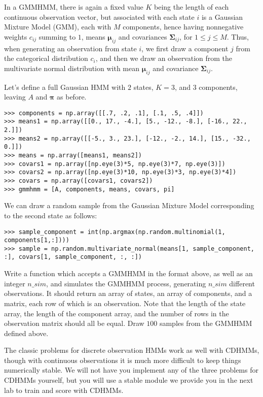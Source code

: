 In a GMMHMM, there is again a fixed value $K$ being the length of each continuous observation vector, but associated with each state $i$ is a Gaussian Mixture Model (GMM), each with $M$ components, hence having nonnegative weights $c_{ij}$ summing to $1$, means $\mathbf{\mu}_{ij}$ and covariances $\mathbf{\Sigma}_{ij}$, for $1 \leq j \leq M$. Thus, when generating an observation from state $i$, we first draw a component $j$ from the categorical distribution $c_{i}$, and then we draw an observation from the multivariate normal distribution with mean $\mathbf{\mu}_{ij}$ and covariance $\mathbf{\Sigma}_{ij}$.

Let's define a full Gaussian HMM with $2$ states, $K = 3$, and $3$ components, leaving $A$ and $\mathbf{\pi}$ as before.
\begin{lstlisting}
>>> components = np.array([[.7, .2, .1], [.1, .5, .4]])
>>> means1 = np.array([[0., 17., -4.], [5., -12., -8.], [-16., 22., 2.]])
>>> means2 = np.array([[-5., 3., 23.], [-12., -2., 14.], [15., -32., 0.]])
>>> means = np.array([means1, means2])
>>> covars1 = np.array([np.eye(3)*5, np.eye(3)*7, np.eye(3)])
>>> covars2 = np.array([np.eye(3)*10, np.eye(3)*3, np.eye(3)*4])
>>> covars = np.array([covars1, covars2])
>>> gmmhmm = [A, components, means, covars, pi]
\end{lstlisting}

We can draw a random sample from the Gaussian Mixture Model corresponding to the second state as follows:
\begin{lstlisting}
>>> sample_component = int(np.argmax(np.random.multinomial(1, components[1,:])))
>>> sample = np.random.multivariate_normal(means[1, sample_component, :], covars[1, sample_component, :, :])
\end{lstlisting}

\begin{problem}
Write a function which accepts a GMMHMM in the format above, as well as an integer $n\_sim$, and simulates the GMMHMM process, generating $n\_sim$ different observations. It should return an array of states, an array of components, and a matrix, each row of which is an observation. Note that the length of the state array, the length of the component array, and the number of rows in the observation matrix should all be equal. Draw $100$ samples from the GMMHMM defined above.
\end{problem}

The classic problems for discrete observation HMMs work as well with CDHMMs, though with continuous observations it is much more difficult to keep things numerically stable. We will not have you implement any of the three problems for CDHMMs yourself, but you will use a stable module we provide you in the next lab to train and score with CDHMMs.